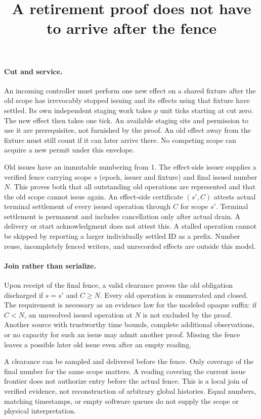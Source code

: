 \documentclass[11pt]{article}
\title{A retirement proof does not have to arrive after the fence}
\date{}
\begin{document}
\maketitle

\paragraph{Cut and service.}
An incoming controller must perform one new effect on a shared fixture after the old scope has irrevocably stopped issuing and its effects using that fixture have settled. Its own independent staging work takes $p$ unit ticks starting at cut zero. The new effect then takes one tick. An available staging site and permission to use it are prerequisites, not furnished by the proof. An old effect away from the fixture must still count if it can later arrive there. No competing scope can acquire a new permit under this envelope.

Old issues have an immutable numbering from 1. The effect-side issuer supplies a verified fence carrying scope $s$ (epoch, issuer and fixture) and final issued number $N$. This proves both that all outstanding old operations are represented and that the old scope cannot issue again. An effect-side certificate $(s',C)$ attests actual terminal settlement of every issued operation through $C$ for scope $s'$. Terminal settlement is permanent and includes cancellation only after actual drain. A delivery or start acknowledgment does not attest this. A stalled operation cannot be skipped by reporting a larger individually settled ID as a prefix. Number reuse, incompletely fenced writers, and unrecorded effects are outside this model.

\paragraph{Join rather than serialize.}
Upon receipt of the final fence, a valid clearance proves the old obligation discharged if $s=s'$ and $C\ge N$. Every old operation is enumerated and closed. The requirement is necessary as an evidence law for the modeled opaque suffix: if $C<N$, an unresolved issued operation at $N$ is not excluded by the proof. Another source with trustworthy time bounds, complete additional observations, or no capacity for such an issue may admit another proof. Missing the fence leaves a possible later old issue even after an empty reading.

A clearance can be sampled and delivered before the fence. Only coverage of the final number for the same scope matters. A reading covering the current issue frontier does not authorize entry before the actual fence. This is a local join of verified evidence, not reconstruction of arbitrary global histories. Equal numbers, matching timestamps, or empty software queues do not supply the scope or physical interpretation.
\end{document}
